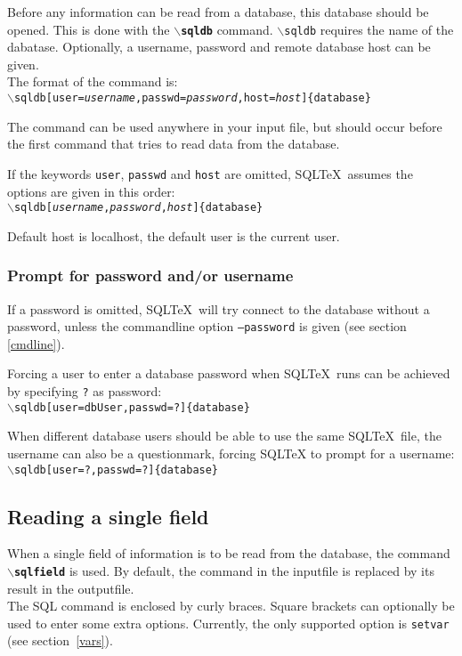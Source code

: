 \documentclass{article}
\newcommand{\bs}{\ensuremath{\backslash}}
\newcommand{\vs}{\vspace{3mm}}
\begin{document}
Before any information can be read from a database, this database should be opened.
This is done with the \texttt{\textbf{\bs sqldb}} command.
\texttt{\bs sqldb} requires the name of the dabatase. Optionally, a username, password and remote database host can be given. \\
The format of the command is:\\
\texttt{\bs sqldb[user=\textit{username},passwd=\textit{password},host=\textit{host}]\{database\}}

The command can be used anywhere in your input file, but should occur before the first command that tries to
read data from the database.

\vs

If the keywords \texttt{user}, \texttt{passwd} and \texttt{host} are omitted, SQL\TeX\ assumes the options are given in
this order:\\
\texttt{\bs sqldb[\textit{username},\textit{password},\textit{host}]\{database\}}

Default host is localhost, the default user is the current user.

\subsubsection{Prompt for password and/or username}

If a password is omitted, SQL\TeX\ will try connect to the database without a password, unless the commandline option \texttt{--password} is given (see section \ref{cmdline}).

\vs 

Forcing a user to enter a database password when SQL\TeX\ runs can be achieved by specifying \texttt{?} as password:\\
\texttt{\bs sqldb[user=dbUser,passwd=?]\{database\}}

\vs

When different database users should be able to use the same SQL\TeX\ file, the username can also be a questionmark, forcing SQL\TeX
to prompt for a username:\\
\texttt{\bs sqldb[user=?,passwd=?]\{database\}}

\subsection{Reading a single field}\label{sqlfield}

When a single field of information is to be read from the database, the command \texttt{\textbf{\bs sqlfield}}
is used. By default, the command in the inputfile is replaced by its result in the outputfile.\\
The SQL command is enclosed by curly braces. Square brackets can optionally be used to enter some extra options.
Currently, the only supported option is \texttt{setvar} (see section~\ref{vars}).
\end{document}
